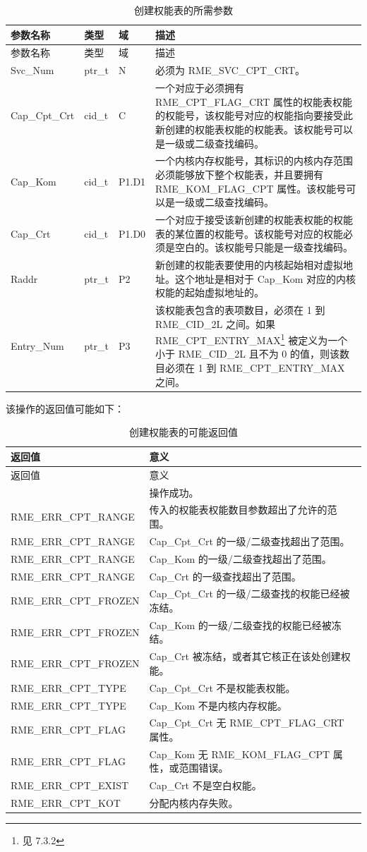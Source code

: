 \begin{xltabular}{\textwidth}{@{}>{\hsize\raggedright\arraybackslash}X>{\hsize\raggedright\arraybackslash}X>{\hsize\raggedright\arraybackslash}X>{\hsize\raggedright\arraybackslash}X@{}}
\caption{创建权能表的所需参数}\label{tab:2-5-create-capability-table-parameters}\\
\toprule
参数名称 & 类型 & 域 & 描述\tabularnewline
\endfirsthead
\toprule
参数名称 & 类型 & 域 & 描述\tabularnewline
\midrule
\endhead
\bottomrule
\endlastfoot
Svc\_Num & ptr\_t & N & 必须为 RME\_SVC\_CPT\_CRT。\tabularnewline
Cap\_Cpt\_Crt & cid\_t & C &
一个对应于必须拥有 RME\_CPT\_FLAG\_CRT 属性的权能表权能的权能号，该权能号对应的权能指向要接受此新创建的权能表权能的权能表。该权能号可以是一级或二级查找编码。\tabularnewline
Cap\_Kom & cid\_t & P1.D1 &
一个内核内存权能号，其标识的内核内存范围必须能够放下整个权能表，并且要拥有 RME\_KOM\_FLAG\_CPT 属性。该权能号可以是一级或二级查找编码。\tabularnewline
Cap\_Crt & cid\_t & P1.D0 &
一个对应于接受该新创建的权能表权能的权能表的某位置的权能号。该权能号对应的权能必须是空白的。该权能号只能是一级查找编码。\tabularnewline
Raddr & ptr\_t & P2 &
新创建的权能表要使用的内核起始相对虚拟地址。这个地址是相对于 Cap\_Kom 对应的内核权能的起始虚拟地址的。\tabularnewline
Entry\_Num & ptr\_t & P3 &
该权能表包含的表项数目，必须在 1 到 RME\_CID\_2L 之间。如果 RME\_CPT\_ENTRY\_MAX\footnote{见 7.3.2} 被定义为一个小于 RME\_CID\_2L 且不为 0 的值，则该数目必须在 1 到 RME\_CPT\_ENTRY\_MAX 之间。\tabularnewline
\end{xltabular}

该操作的返回值可能如下：

\begin{xltabular}{\textwidth}{@{}>{\hsize\raggedright\arraybackslash}X>{\hsize\raggedright\arraybackslash}X@{}}
\caption{创建权能表的可能返回值}\label{tab:2-6-create-capability-table-return-values}\\
\toprule
返回值 & 意义\tabularnewline
\endfirsthead
\toprule
返回值 & 意义\tabularnewline
\midrule
\endhead
\bottomrule
{} & 操作成功。\tabularnewline
    RME\_ERR\_CPT\_RANGE & 传入的权能表权能数目参数超出了允许的范围。\tabularnewline
    RME\_ERR\_CPT\_RANGE & Cap\_Cpt\_Crt 的一级/二级查找超出了范围。\tabularnewline
    RME\_ERR\_CPT\_RANGE & Cap\_Kom 的一级/二级查找超出了范围。\tabularnewline
    RME\_ERR\_CPT\_RANGE & Cap\_Crt 的一级查找超出了范围。\tabularnewline
    RME\_ERR\_CPT\_FROZEN & Cap\_Cpt\_Crt 的一级/二级查找的权能已经被冻结。\tabularnewline
    RME\_ERR\_CPT\_FROZEN & Cap\_Kom 的一级/二级查找的权能已经被冻结。\tabularnewline
    RME\_ERR\_CPT\_FROZEN & Cap\_Crt 被冻结，或者其它核正在该处创建权能。\tabularnewline
    RME\_ERR\_CPT\_TYPE & Cap\_Cpt\_Crt 不是权能表权能。\tabularnewline
    RME\_ERR\_CPT\_TYPE & Cap\_Kom 不是内核内存权能。\tabularnewline
    RME\_ERR\_CPT\_FLAG & Cap\_Cpt\_Crt 无 RME\_CPT\_FLAG\_CRT 属性。\tabularnewline
    RME\_ERR\_CPT\_FLAG & Cap\_Kom 无 RME\_KOM\_FLAG\_CPT 属性，或范围错误。\tabularnewline
    RME\_ERR\_CPT\_EXIST & Cap\_Crt 不是空白权能。\tabularnewline
    RME\_ERR\_CPT\_KOT & 分配内核内存失败。\tabularnewline
\end{xltabular}

